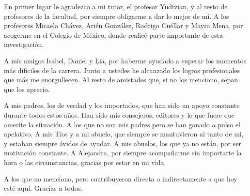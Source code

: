 \begin{acknowledgements}
    En primer lugar le agradezco a mi tutor, el profesor Yudivian, y al resto de profesores de la facultad, por siempre obligarme a dar lo mejor de mi. A los profesores Micaela Chávez, Arién González, Rodrigo Cuéllar y Mayra Mena, por acogerme en el Colegio de México, donde realicé parte importante de esta investigación.
    
    A mis amigos Isabel, Daniel y Lia, por haberme ayudado a superar los momentos más dificiles de la carrera. Junto a ustedes he alcanzado los logros profesionales que más me enorgullecen. Al resto de amistades que, si no los menciono, sepan que los aprecio.

    A mis padres, los de verdad y los importados, que han sido un apoyo constante durante todos estos años. Han sido mis consejeros, editores y lo que fuere que amerite la situación. A los que no son mis padres pero se han ganado a pulso el apelativo. A mis Tíos y a mi abuelo, que siempre se mantuvieron al tanto de mi, y estaban siempre ávidos de ayudar. A mis abuelos, los que ya no están, por ser motivación constante. A Alejandra, por siempre acompañarme sin importarte la hora o las circunstancias, gracias por estar en mi vida. 

    A los que no menciono, pero contribuyeron directa o indirectamente a que hoy esté aquí. Gracias a todos.
\end{acknowledgements}